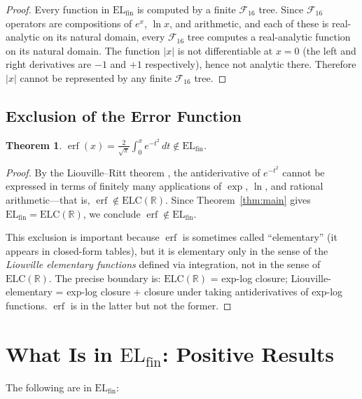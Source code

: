 \documentclass[12pt,a4paper]{article}
\newtheorem{theorem}{Theorem}[section]
\theoremstyle{definition}
\newcommand{\F}{\mathcal{F}_{16}}
\newcommand{\ELfin}{\mathrm{EL}_{\mathrm{fin}}}
\newcommand{\ELC}{\mathrm{ELC}(\mathbb{R})}
\begin{document}
\begin{proof}
Every function in $\ELfin$ is computed by a finite $\F$ tree.  Since $\F$
operators are compositions of $e^x$, $\ln x$, and arithmetic, and each of
these is real-analytic on its natural domain, every $\F$ tree computes a
real-analytic function on its natural domain.  The function $|x|$ is not
differentiable at $x=0$ (the left and right derivatives are $-1$ and $+1$
respectively), hence not analytic there.  Therefore $|x|$ cannot be represented
by any finite $\F$ tree.
\end{proof}

\subsection{Exclusion of the Error Function}

\begin{theorem}
\label{thm:erf}
$\operatorname{erf}(x) = \tfrac{2}{\sqrt{\pi}}\int_0^x e^{-t^2}\,dt \notin \ELfin$.
\end{theorem}

\begin{proof}
By the Liouville--Ritt theorem \cite{Ritt1948}, the antiderivative of $e^{-t^2}$
cannot be expressed in terms of finitely many applications of $\exp$, $\ln$, and
rational arithmetic---that is, $\operatorname{erf}\notin\ELC$.  Since
Theorem~\ref{thm:main} gives $\ELfin=\ELC$, we conclude
$\operatorname{erf}\notin\ELfin$.

This exclusion is important because $\operatorname{erf}$ is sometimes called
``elementary'' (it appears in closed-form tables), but it is elementary only in
the sense of the \emph{Liouville elementary functions} defined via integration,
not in the sense of $\ELC$.  The precise boundary is: $\ELC$ = exp-log closure;
Liouville-elementary = exp-log closure + closure under taking antiderivatives of
exp-log functions.  $\operatorname{erf}$ is in the latter but not the former.
\end{proof}

\section{What Is in \texorpdfstring{$\ELfin$}{ELfin}: Positive Results}
\label{sec:positive}

The following are in $\ELfin$:
\end{document}
